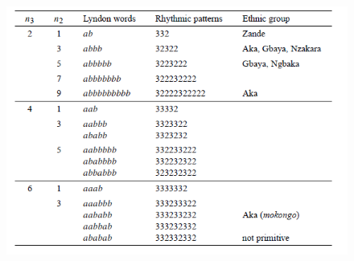 \documentclass{beamer}
\theoremstyle{definition}
\begin{document}
\begin{frame}[fragile]
\begin{figure}[h!]
\includegraphics[scale=0.5]{tabla}
\end{figure}

\end{frame}







%
\end{document}
